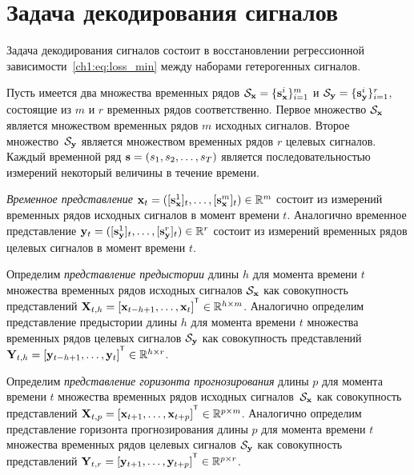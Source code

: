 \section{Задача декодирования сигналов}
\label{sec:ch1:decoding_task}

Задача декодирования сигналов состоит в восстановлении регрессионной зависимости~\eqref{ch1:eq:loss_min} между наборами гетерогенных сигналов.

Пусть имеется два множества временных рядов $\mathcal{S}_{\mathbf{x}} = \{\mathbf{s}_{\mathbf{x}}^i\}_{i=1}^m$ и $\mathcal{S}_{\mathbf{y}} = \{\mathbf{s}_{\mathbf{y}}^i\}_{i=1}^r$, состоящие из $m$ и $r$ временных рядов соответственно. 
Первое множество $\mathcal{S}_{\mathbf{x}}$ является множеством временных рядов $m$ исходных сигналов. 
Второе множество~$\mathcal{S}_{\mathbf{y}}$ является множеством временных рядов $r$ целевых сигналов.
Каждый временной ряд $\mathbf{s} = (s_1, s_2, \dots, s_T)$ является последовательностью измерений некоторый величины в течение времени. 
\begin{definition}
	 \textit{Временное представление} $\mathbf{x}_t = ([\mathbf{s}_{\mathbf{x}}^1]_t, \dots, [\mathbf{s}_{\mathbf{x}}^m]_t) \in \mathbb{R}^m$ состоит из измерений временных рядов исходных сигналов в момент времени $t$. 
	Аналогично временное представление $\mathbf{y}_t = ([\mathbf{s}_{\mathbf{y}}^1]_t, \dots, [\mathbf{s}_{\mathbf{y}}^r]_t) \in \mathbb{R}^r$ состоит из измерений временных рядов целевых сигналов в момент времени $t$.
\end{definition}
\begin{definition}
	Определим \textit{представление предыстории} длины $h$ для момента времени $t$ множества временных рядов исходных сигналов $\mathcal{S}_{\mathbf{x}}$ как совокупность представлений $\bX_{t,h} = [\bx_{t - h + 1}, \dots, \bx_{t}]^{\T} \in \bbR^{h \times m}$.
	Аналогично определим представление предыстории длины $h$ для момента времени $t$ множества временных рядов целевых сигналов $\mathcal{S}_{\mathbf{y}}$ как совокупность представлений $\bY_{t,h} = [\by_{t - h + 1}, \dots, \by_{t}]^{\T} \in \bbR^{h \times r}$.
\end{definition}
\begin{definition}
	Определим \textit{представление горизонта прогнозирования} длины $p$ для момента времени $t$ множества временных рядов исходных сигналов~$\mathcal{S}_{\mathbf{x}}$ как совокупность представлений $\bX_{t,p} = [\bx_{t + 1}, \dots, \bx_{t + p}]^{\T} \in \bbR^{p \times m}$.
	Аналогично определим представление горизонта прогнозирования длины $p$ для момента времени $t$ множества временных рядов целевых сигналов $\mathcal{S}_{\mathbf{y}}$ как совокупность представлений $\bY_{t,r} = [\by_{t + 1}, \dots, \by_{t + p}]^{\T} \in \bbR^{p \times r}$.
\end{definition}

